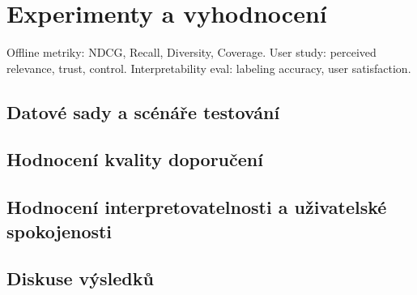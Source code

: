 
\chapter{Experimenty a vyhodnocení}
Offline metriky: NDCG, Recall, Diversity, Coverage.
User study: perceived relevance, trust, control.
Interpretability eval: labeling accuracy, user satisfaction.


\section{Datové sady a scénáře testování}
\section{Hodnocení kvality doporučení}
\section{Hodnocení interpretovatelnosti a uživatelské spokojenosti}
\section{Diskuse výsledků}
